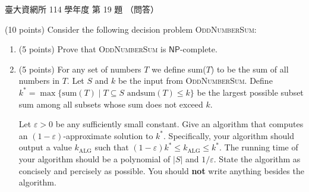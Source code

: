 \begin{pastexam}[label={px:ntu-114-dsa-19}]{臺大資網所 114 學年度 第 19 題}
（問答）

(10 points) Consider the following decision problem \textsc{OddNumberSum}:
\begin{center}
\end{center}
\begin{enumerate}[label=(\alph*)]
\item (5 points) Prove that \textsc{OddNumberSum} is $\mathsf{NP}$-complete.
\item (5 points) For any set of numbers $T$ we define sum($T$) to be the sum of all numbers in $T$. Let $S$ and $k$
be the input from \textsc{OddNumberSum}. Define $k^*=\max\{\mathrm{sum}(T)\mid T\subseteq S\text{ and
}\mathrm{sum}(T)\le k\}$ be the largest possible subset sum among all subsets whose sum does not exceed $k$.

Let $\varepsilon>0$ be any sufficiently small constant. Give an algorithm that computes an
$(1-\varepsilon)$-approximate solution to $k^*$. Specifically, your algorithm should output a value
$k_{\mathrm{ALG}}$ such that $(1-\varepsilon)k^*\le k_{\mathrm{ALG}}\le k^*$. The running time of your algorithm
should be a polynomial of $|S|$ and $1/\varepsilon$. State the algorithm as concisely and percisely as possible.
You should \textbf{not} write anything besides the algorithm.
\end{enumerate}
\end{pastexam}


